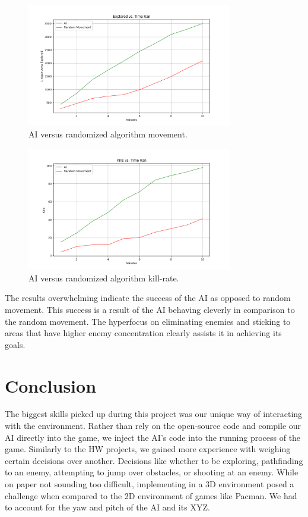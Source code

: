 \documentclass[11pt,a4paper]{article}
\begin{document}
\begin{figure}[H]
    \centering
    \includegraphics[width=0.8\textwidth]{areaExploredGraph.png}
    \caption{AI versus randomized algorithm movement.}
    \label{fig:three}
\end{figure}
\begin{figure}[H]
    \centering
    \includegraphics[width=0.8\textwidth]{killsGraph.png}
    \caption{AI versus randomized algorithm kill-rate.}
    \label{fig:four}
\end{figure}

The results overwhelming indicate the success of the AI as opposed to random movement. This success is a result of the AI behaving cleverly in comparison to the random movement. The hyperfocus on eliminating enemies and sticking to areas that have higher enemy concentration clearly assists it in achieving its goals.

\section{Conclusion}
The biggest skills picked up during this project was our unique way of interacting with the environment. Rather than rely on the open-source code and compile our AI directly into the game, we inject the AI’s code into the running process of the game. Similarly to the HW projects, we gained more experience with weighing certain decisions over another. Decisions like whether to be exploring, pathfinding to an enemy, attempting to jump over obstacles, or shooting at an enemy. While on paper not sounding too difficult, implementing in a 3D environment posed a challenge when compared to the 2D environment of games like Pacman. We had to account for the yaw and pitch of the AI and its XYZ. 
\end{document}
